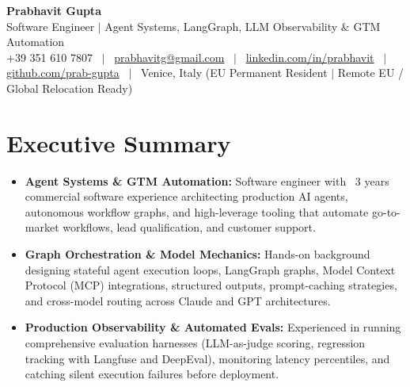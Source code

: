 \documentclass[a4paper,10pt]{article}
\begin{document}
\begin{minipage}[c]{0.80\textwidth}
  {\Huge\bfseries Prabhavit Gupta}\\[3pt]
  {\color{accent}\large Software Engineer $\vert$ Agent Systems, LangGraph, LLM Observability $\&$ GTM Automation}\\[6pt]
  {\footnotesize +39 351 610 7807 ~$\vert$~
  \href{mailto:prabhavitg@gmail.com}{prabhavitg@gmail.com} ~$\vert$~
  \href{https://www.linkedin.com/in/prabhavit/}{linkedin.com/in/prabhavit} ~$\vert$~
  \href{https://github.com/prab-gupta}{github.com/prab-gupta} ~$\vert$~
  Venice, Italy (EU Permanent Resident $\vert$ Remote EU / Global Relocation Ready)}
\end{minipage}\hfill

\vspace{6pt}

\section{Executive Summary}
\begin{itemize}
  \item \textbf{Agent Systems \& GTM Automation:} Software engineer with ~3 years commercial software experience architecting production AI agents, autonomous workflow graphs, and high-leverage tooling that automate go-to-market workflows, lead qualification, and customer support.
  \item \textbf{Graph Orchestration \& Model Mechanics:} Hands-on background designing stateful agent execution loops, LangGraph graphs, Model Context Protocol (MCP) integrations, structured outputs, prompt-caching strategies, and cross-model routing across Claude and GPT architectures.
  \item \textbf{Production Observability \& Automated Evals:} Experienced in running comprehensive evaluation harnesses (LLM-as-judge scoring, regression tracking with Langfuse and DeepEval), monitoring latency percentiles, and catching silent execution failures before deployment.
\end{itemize}

\end{document}

